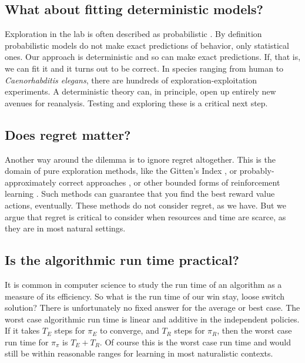 \subsection*{What about fitting deterministic models?}
Exploration in the lab is often described as probabilistic \citep{Calhoun2014,Song2019a,Gershman2018b,Schulz2018a}. By definition probabilistic models do not make exact predictions of behavior, only statistical ones. Our approach is deterministic and so can make exact predictions. If, that is, we can fit it and it turns out to be correct. In species ranging from human to \textit{Caenorhabditis elegans}, there are hundreds of exploration-exploitation experiments. A deterministic theory can, in principle, open up entirely new avenues for reanalysis. Testing and exploring these is a critical next step.


\subsection*{Does regret matter?}
Another way around the dilemma is to ignore regret altogether. This is the domain of pure exploration methods, like the Gitten’s Index \citep{Gittins1979}, or probably-approximately correct approaches \citep{Valiant1984}, or other bounded forms of reinforcement learning \citep{Brafman2002}. Such methods can guarantee that you find the best reward value actions, eventually. These methods do not consider regret, as we have. But we argue that regret is critical to consider when resources and time are scarce, as they are in most natural settings. 


\subsection*{Is the algorithmic run time practical?}
It is common in computer science to study the run time of an algorithm as a measure of its efficiency. So what is the run time of our win stay, loose switch solution? There is unfortunately no fixed answer for the average or best case. The worst case algorithmic run time is linear and additive in the independent policies. If it takes $T_E$ steps for $\pi_E$ to converge, and $T_R$ steps for $\pi_R$, then the worst case run time for $\pi_{\pi}$ is $T_E + T_R$. Of course this is the worst case run time and would still be within reasonable ranges for learning in most naturalistic contexts.


